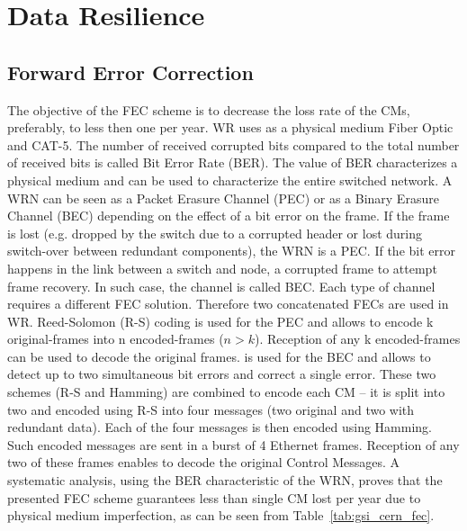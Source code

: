 \section{Data Resilience}


\subsection{Forward Error Correction}
\label{sec:fec}

The objective of the FEC scheme is to decrease the loss rate of the CMs, preferably, 
to less then one per year. WR uses as a physical medium Fiber Optic and CAT-5. The number 
of received corrupted bits compared to the total number of received bits is called Bit Error Rate 
(BER). The value of BER  characterizes a physical medium and can be used to characterize the entire 
switched network.
A WRN can be seen as a Packet Erasure Channel (PEC) or as a Binary Erasure Channel (BEC) depending 
on the effect of a bit error on the frame. If the frame is lost (e.g. dropped by the switch due to 
a corrupted header or lost during switch-over between redundant components), the WRN is a PEC. 
If the bit error happens in the link between a switch and node, a corrupted frame 
to attempt frame recovery. In such case, the channel is called BEC. Each type of channel requires 
a different FEC solution. Therefore two concatenated FECs are used in WR. 
Reed-Solomon (R-S) %
coding is used for the PEC and 
allows to encode k original-frames into n encoded-frames ($n>k$). 
Reception of any k encoded-frames can be used to decode the original frames. 
is used for the BEC and allows to detect up to two simultaneous bit errors and 
correct a single error.
These two schemes (R-S and Hamming) are combined to encode each CM -- it is 
split into two and encoded using R-S into four messages (two original and two 
with redundant data). Each of the four messages is then encoded using Hamming. Such encoded 
messages are sent in a burst of 4 Ethernet frames. Reception of any two of these frames enables 
to decode the original Control Messages. 
A systematic analysis, using the BER characteristic of the WRN, proves that the presented FEC scheme 
guarantees less than single CM lost per year due to physical medium 
imperfection, as can be seen from Table~\ref{tab:gsi_cern_fec}. 


